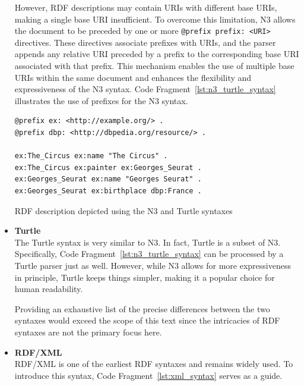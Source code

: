 \begin{itemize}
    However, RDF descriptions may contain URIs with different base URIs, making a single base URI insufficient. To overcome this limitation, N3 allows the document to be preceded by one or more \texttt{@prefix prefix: <URI>} directives. These directives associate prefixes with URIs, and the parser appends any relative URI preceded by a prefix to the corresponding base URI associated with that prefix. This mechanism enables the use of multiple base URIs within the same document and enhances the flexibility and expressiveness of the N3 syntax. Code Fragment~\ref{lst:n3_turtle_syntax} illustrates the use of prefixes for the N3 syntax.  \citep{berners2011notation3}

    \begin{listing}[htbp]
        \begin{verbatim}
@prefix ex: <http://example.org/> .
@prefix dbp: <http://dbpedia.org/resource/> .

ex:The_Circus ex:name "The Circus" .
ex:The_Circus ex:painter ex:Georges_Seurat .
ex:Georges_Seurat ex:name "Georges Seurat" .
ex:Georges_Seurat ex:birthplace dbp:France .
        \end{verbatim}
        \caption{RDF description depicted using the N3 and Turtle syntaxes}
        \label{lst:n3_turtle_syntax}
    \end{listing}

    \item \textbf{Turtle}\\
    The Turtle syntax is very similar to N3. In fact, Turtle is a subset of N3. Specifically, Code Fragment~\ref{lst:n3_turtle_syntax} can be processed by a Turtle parser just as well. However, while N3 allows for more expressiveness in principle, Turtle keeps things simpler, making it a popular choice for human readability. \citep{berners2011notation3} \citep{prudhommeaux2014turtle}

    Providing an exhaustive list of the precise differences between the two syntaxes would exceed the scope of this text since the intricacies of RDF syntaxes are not the primary focus here.

    \item  \textbf{RDF/XML}\\
    RDF/XML is one of the earliest RDF syntaxes and remains widely used. To introduce this syntax, Code Fragment~\ref{lst:xml_syntax} serves as a guide.


\end{itemize}

